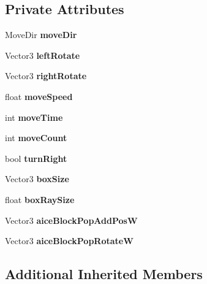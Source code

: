 \subsection*{Private Attributes}
\begin{DoxyCompactItemize}
\item 
\mbox{\label{class_squid_aee00be5c0860b3f1423ea1cdfdbf0119}} 
Move\+Dir {\bfseries move\+Dir}
\item 
\mbox{\label{class_squid_a83b929aca26eae1999d7d7b55b6ac0a7}} 
Vector3 {\bfseries left\+Rotate}
\item 
\mbox{\label{class_squid_a198545cd0e1c3946c66ca1b0003cc75b}} 
Vector3 {\bfseries right\+Rotate}
\item 
\mbox{\label{class_squid_a070dfa8015b97a141ccbd186ba24e6c6}} 
float {\bfseries move\+Speed}
\item 
\mbox{\label{class_squid_a2d2f75e4c56cb5c92bc7daab4cc09242}} 
int {\bfseries move\+Time}
\item 
\mbox{\label{class_squid_a6d7a5349869a24c03e77873505e4c716}} 
int {\bfseries move\+Count}
\item 
\mbox{\label{class_squid_ac56a84fb6b406e228f2732393dcd2631}} 
bool {\bfseries turn\+Right}
\item 
\mbox{\label{class_squid_a260ede7ae6bd7b0491274df50f478f52}} 
Vector3 {\bfseries box\+Size}
\item 
\mbox{\label{class_squid_a7bdcf030408472170d2ab679312ecf18}} 
float {\bfseries box\+Ray\+Size}
\item 
\mbox{\label{class_squid_a83714f003856eb62588e1bd5beaad6d7}} 
Vector3 {\bfseries aice\+Block\+Pop\+Add\+PosW}
\item 
\mbox{\label{class_squid_ac4dd2739d11d9afa2279bee71772c8f4}} 
Vector3 {\bfseries aice\+Block\+Pop\+RotateW}
\end{DoxyCompactItemize}
\subsection*{Additional Inherited Members}


